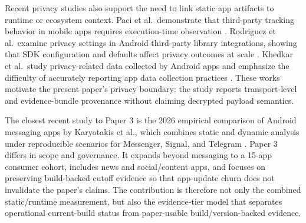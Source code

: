 Recent privacy studies also support the need to link static app artifacts to runtime or ecosystem context. Paci et al.\ demonstrate that third-party tracking behavior in mobile apps requires execution-time observation \cite{paci2023tracking}. Rodriguez et al.\ examine privacy settings in Android third-party library integrations, showing that SDK configuration and defaults affect privacy outcomes at scale \cite{rodriguez2025privacysettings}. Khedkar et al.\ study privacy-related data collected by Android apps and emphasize the difficulty of accurately reporting app data collection practices \cite{khedkar2026privacydata}. These works motivate the present paper's privacy boundary: the study reports transport-level and evidence-bundle provenance without claiming decrypted payload semantics.

The closest recent study to Paper 3 is the 2026 empirical comparison of Android messaging apps by Karyotakis et al., which combines static and dynamic analysis under reproducible scenarios for Messenger, Signal, and Telegram \cite{karyotakis2026messaging}. Paper 3 differs in scope and governance. It expands beyond messaging to a 15-app consumer cohort, includes news and social/content apps, and focuses on preserving build-backed cutoff evidence so that app-update churn does not invalidate the paper's claims. The contribution is therefore not only the combined static/runtime measurement, but also the evidence-tier model that separates operational current-build status from paper-usable build/version-backed evidence.
